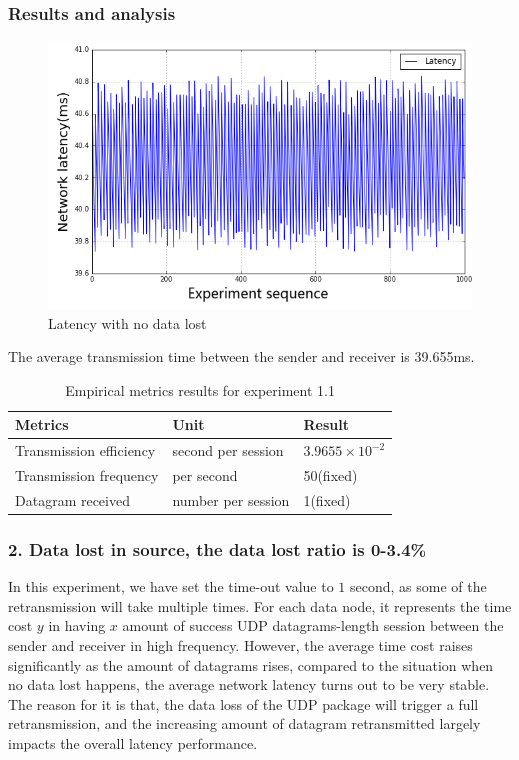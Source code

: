 \documentclass[11pt,openright,a4paper]{report}
\begin{document}
\subsubsection{Results and analysis}
\begin{figure}[H]
\centering
\includegraphics[width=0.6\linewidth]{picture/experiments/exp1/latency}
\caption{Latency with no data lost}
\label{fig:latency}
\end{figure}
The average transmission time between the sender and receiver is 39.655ms. 
\begin{table}[H]
	\centering
	\caption{Empirical metrics results for experiment 1.1}
	\label{my-label}
	\begin{tabular}{@{}lll@{}}
		\toprule
		Metrics                 & Unit               & Result                 \\ \midrule
		Transmission efficiency & second per session & $3.9655\times 10^{-2}$ \\
		Transmission frequency  & per second        & 50(fixed)              \\
		Datagram received       & number per session & 1(fixed)            \\ \bottomrule
	\end{tabular}
\end{table}

\subsubsection{2. Data lost in source, the data lost ratio is 0-3.4\%}
In this experiment, we have set the time-out value to $1$ second, as some of the retransmission will take multiple times. For each data node, it represents the time cost $y$ in having $x$ amount of success UDP datagrams-length session between the sender and receiver in high frequency. However, the average time cost raises significantly as the amount of datagrams rises, compared to the situation when no data lost happens, the average network latency turns out to be very stable. The reason for it is that, the data loss of the UDP package will trigger a full retransmission, and the increasing amount of datagram retransmitted largely impacts the overall latency performance.\\
\end{document}
